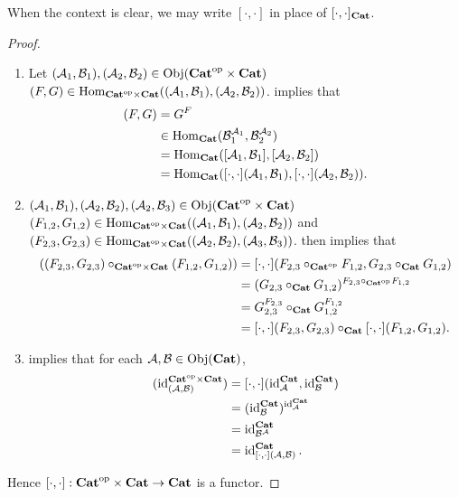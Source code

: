 \documentclass{book}
\begin{document}
	\begin{note}
		When the context is clear, we may write $[\cdot, \cdot]$ in place of $[\cdot, \cdot]_{\operatorname*{\text{\textbf{Cat}}}}$.
	\end{note}
	
	\begin{proof}\
		\begin{enumerate}
			\item Let $(\mathcal{A}_1, \mathcal{B}_1), (\mathcal{A}_2, \mathcal{B}_2) \in \operatorname{Obj}({\operatorname*{\text{\textbf{Cat}}}}^{\text{op}} \times \operatorname*{\text{\textbf{Cat}}})$ $(F, G) \in \operatorname{Hom}_{{\operatorname*{\text{\textbf{Cat}}}}^{\text{op}} \times \operatorname*{\text{\textbf{Cat}}}}((\mathcal{A}_1, \mathcal{B}_1), (\mathcal{A}_2, \mathcal{B}_2))$.  implies that 
			\begin{align*}
				[\cdot, \cdot](F,G)
				& = G^F \\
				& \in \Hom_{\bCat}(\MB_1^{\MA_1}, \MB_2^{\MA_2}) \\
				& = \Hom_{\bCat}([\MA_1, \MB_1], [\MA_2, \MB_2]) \\
				& = \Hom_{\bCat}([\cdot, \cdot](\MA_1, \MB_1), [\cdot, \cdot](\MA_2, \MB_2)).
			\end{align*}
			\item $(\mathcal{A}_1, \mathcal{B}_1), (\mathcal{A}_2, \mathcal{B}_2), (\mathcal{A}_2, \mathcal{B}_3) \in \operatorname{Obj}({\operatorname*{\text{\textbf{Cat}}}}^{\text{op}} \times \operatorname*{\text{\textbf{Cat}}})$ $(F_{1,2}, G_{1,2}) \in \operatorname{Hom}_{{\operatorname*{\text{\textbf{Cat}}}}^{\text{op}} \times \operatorname*{\text{\textbf{Cat}}}}((\mathcal{A}_1, \mathcal{B}_1), (\mathcal{A}_2, \mathcal{B}_2))$ and  $(F_{2,3}, G_{2,3}) \in \operatorname{Hom}_{{\operatorname*{\text{\textbf{Cat}}}}^{\text{op}} \times \operatorname*{\text{\textbf{Cat}}}}((\mathcal{A}_2, \mathcal{B}_2), (\mathcal{A}_3, \mathcal{B}_3))$.  then implies that
			\begin{align*}
				[\cdot, \cdot]((F_{2,3}, G_{2,3}) \circ_{\op{\bCat} \times \bCat} (F_{1,2}, G_{1,2})) 
				& = [\cdot, \cdot](F_{2,3} \circ_{\op{\bCat}} F_{1,2}, G_{2,3} \circ_{\bCat} G_{1,2}) \\
				& = (G_{2,3} \circ_{\bCat} G_{1,2})^{F_{2,3} \circ_{\op{\bCat}} F_{1,2}} \\
				& = G_{2,3}^{F_{2,3}} \circ_{\bCat} G_{1,2}^{F_{1,2}} \\
				& = [\cdot, \cdot](F_{2,3}, G_{2,3}) \circ_{\bCat} [\cdot, \cdot](F_{1,2}, G_{1,2}).
			\end{align*}
			\item {} implies that for each $\mathcal{A}, \mathcal{B} \in \operatorname{Obj}(\operatorname*{\text{\textbf{Cat}}})$,
			\begin{align*}
				[\cdot, \cdot](\id_{(\MA, \MB)}^{\op{\bCat} \times \bCat})
				& = [\cdot, \cdot](\id_{\MA}^{\bCat}, \id_{\MB}^{\bCat}) \\
				& = (\id_{\MB}^{\bCat})^{\id_{\MA}^{\bCat}} \\
				& = \id_{\MB^{\MA}}^{\bCat} \\
				& = \id_{[\cdot, \cdot](\MA, \MB)}^{\bCat}.
			\end{align*}
		\end{enumerate}
		Hence $[\cdot, \cdot]: {\operatorname*{\text{\textbf{Cat}}}}^{\text{op}} \times \operatorname*{\text{\textbf{Cat}}} \rightarrow \operatorname*{\text{\textbf{Cat}}}$ is a functor.
	\end{proof}
	
\end{document}
